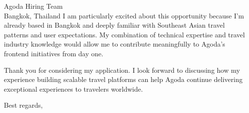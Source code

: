 \documentclass[11pt,a4paper]{letter}
\begin{document}
\begin{letter}{Agoda Hiring Team \\ Bangkok, Thailand}
I am particularly excited about this opportunity because I'm already based in Bangkok and deeply familiar with Southeast Asian travel patterns and user expectations. My combination of technical expertise and travel industry knowledge would allow me to contribute meaningfully to Agoda's frontend initiatives from day one.

Thank you for considering my application. I look forward to discussing how my experience building scalable travel platforms can help Agoda continue delivering exceptional experiences to travelers worldwide.

\closing{Best regards,}

\end{letter}
\end{document}
